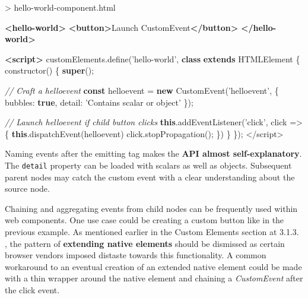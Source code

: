 \documentclass[]{article}
\newenvironment{Shaded}{}{}
\newcommand{\KeywordTok}[1]{\textcolor[rgb]{0.00,0.44,0.13}{\textbf{{#1}}}}
\newcommand{\DataTypeTok}[1]{\textcolor[rgb]{0.56,0.13,0.00}{{#1}}}
\newcommand{\StringTok}[1]{\textcolor[rgb]{0.25,0.44,0.63}{{#1}}}
\newcommand{\SpecialStringTok}[1]{\textcolor[rgb]{0.73,0.40,0.53}{{#1}}}
\newcommand{\CommentTok}[1]{\textcolor[rgb]{0.38,0.63,0.69}{\textit{{#1}}}}
\newcommand{\VariableTok}[1]{\textcolor[rgb]{0.10,0.09,0.49}{{#1}}}
\newcommand{\OperatorTok}[1]{\textcolor[rgb]{0.40,0.40,0.40}{{#1}}}
\newcommand{\AttributeTok}[1]{\textcolor[rgb]{0.49,0.56,0.16}{{#1}}}
\newcommand{\NormalTok}[1]{{#1}}
\begin{document}
\begin{Shaded}
\begin{Highlighting}[]
\NormalTok{> hello-world-component.html}

\KeywordTok{<hello-world>}
 \KeywordTok{<button>}\NormalTok{Launch CustomEvent}\KeywordTok{</button>}
\KeywordTok{</hello-world>}

\KeywordTok{<script>}
 \VariableTok{customElements}\NormalTok{.}\AttributeTok{define}\NormalTok{(}\StringTok{'hello-world'}\OperatorTok{,} 
 \KeywordTok{class} \KeywordTok{extends} \NormalTok{HTMLElement }\OperatorTok{\{}
  \AttributeTok{constructor}\NormalTok{() }\OperatorTok{\{}
    \KeywordTok{super}\NormalTok{()}\OperatorTok{;}
   
   \CommentTok{// Craft a helloevent}
    \KeywordTok{const} \NormalTok{helloevent }\OperatorTok{=} \KeywordTok{new} \AttributeTok{CustomEvent}\NormalTok{(}\StringTok{'helloevent'}\OperatorTok{,} \OperatorTok{\{}
    \DataTypeTok{bubbles}\OperatorTok{:} \KeywordTok{true}\OperatorTok{,}
    \DataTypeTok{detail}\OperatorTok{:} \StringTok{'Contains scalar or object'}
   \OperatorTok{\}}\NormalTok{)}\OperatorTok{;}
   
   \CommentTok{// Launch helloevent if child button clicks}
   \KeywordTok{this}\NormalTok{.}\AttributeTok{addEventListener}\NormalTok{(}\StringTok{'click'}\OperatorTok{,} \NormalTok{click }\OperatorTok{=>} \OperatorTok{\{}
    \KeywordTok{this}\NormalTok{.}\AttributeTok{dispatchEvent}\NormalTok{(helloevent)}
    \VariableTok{click}\NormalTok{.}\AttributeTok{stopPropagation}\NormalTok{()}\OperatorTok{;}
   \OperatorTok{\}}\NormalTok{)}
  \OperatorTok{\}}
 \OperatorTok{\}}\NormalTok{)}\OperatorTok{;}
\OperatorTok{<}\SpecialStringTok{/script>}
\end{Highlighting}
\end{Shaded}

Naming events after the emitting tag makes the \textbf{API almost
self-explanatory}. The \texttt{detail} property can be loaded with
scalars as well as objects. Subsequent parent nodes may catch the custom
event with a clear understanding about the source node.

Chaining and aggregating events from child nodes can be frequently used
within web components. One use case could be creating a custom button
like in the previous example. As mentioned earlier in the Custom
Elements section at 3.1.3. , the pattern of \textbf{extending native
elements} should be dismissed as certain browser vendors imposed
distaste towards this functionality. A common workaround to an eventual
creation of an extended native element could be made with a thin wrapper
around the native element and chaining a \emph{CustomEvent} after the
click event.
\end{document}
